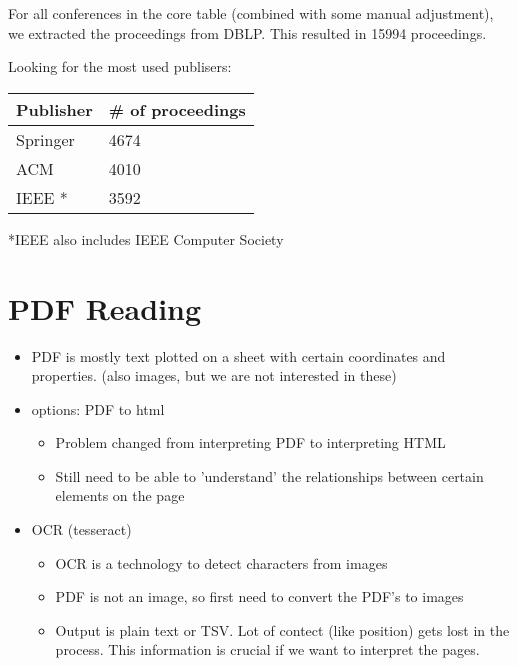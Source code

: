 {For all conferences in the core table (combined with some manual adjustment), we extracted the proceedings from DBLP.
This resulted in 15994 proceedings.

Looking for the most used publisers:
\begin{table}[h]
\begin{tabular}{ll}
\hline
Publisher & \# of proceedings \\ \hline
Springer  & 4674              \\
ACM       & 4010              \\
IEEE *    & 3592             
\end{tabular}
\end{table}
*IEEE also includes IEEE Computer Society
} %

\section{PDF Reading}
\begin{itemize}
    \item PDF is mostly text plotted on a sheet with certain coordinates and properties. (also images, but we are not interested in these)
    \item options: PDF to html
    \begin{itemize}
        \item Problem changed from interpreting PDF to interpreting HTML
        \item Still need to be able to 'understand' the relationships between certain elements on the page
    \end{itemize}
    \item OCR (tesseract)
    \begin{itemize}
        \item OCR is a technology to detect characters from images
        \item PDF is not an image, so first need to convert the PDF's to images
        \item Output is plain text or TSV. Lot of contect (like position) gets lost in the process. This information is crucial if we want to interpret the pages.
    \end{itemize}
\end{itemize}
